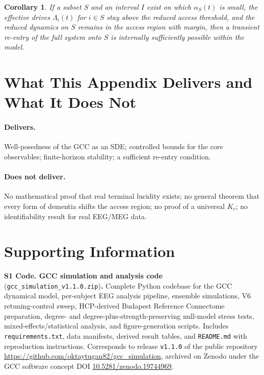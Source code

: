 \documentclass[11pt,a4paper]{article}
\theoremstyle{plain}
\newtheorem{corollary}[theorem]{Corollary}
\theoremstyle{definition}
\theoremstyle{remark}
\begin{document}
\begin{corollary}
\label{kor:lucidity}
If a subset $S$ and an interval $I$ exist on which $\alpha_S(t)$ is small, the effective drives $\Lambda_i(t)$ for $i \in S$ stay above the reduced access threshold, and the reduced dynamics on $S$ remains in the access region with margin, then a transient re-entry of the full system onto $S$ is internally sufficiently possible within the model.
\end{corollary}

\section{What This Appendix Delivers and What It Does Not}

\paragraph{Delivers.}
Well-posedness of the GCC as an SDE; controlled bounds for the core observables; finite-horizon stability; a sufficient re-entry condition.

\paragraph{Does not deliver.}
No mathematical proof that real terminal lucidity exists; no general theorem that every form of dementia shifts the access region; no proof of a universal $K_c$; no identifiability result for real EEG/MEG data.


\section*{Supporting Information}

\noindent\textbf{S1 Code. GCC simulation and analysis code} (\texttt{gcc\_simulation\_v1.1.0.zip})\textbf{.} Complete Python codebase for the GCC dynamical model, per-subject EEG analysis pipeline, ensemble simulations, V6 retuning-control sweep, HCP-derived Budapest Reference Connectome preparation, degree- and degree-plus-strength-preserving null-model stress tests, mixed-effects/statistical analysis, and figure-generation scripts. Includes \texttt{requirements.txt}, data manifests, derived result tables, and \texttt{README.md} with reproduction instructions. Corresponds to release \texttt{v1.1.0} of the public repository \url{https://github.com/oktaytugan82/gcc_simulation}, archived on Zenodo under the GCC software concept DOI \href{https://doi.org/10.5281/zenodo.19744969}{10.5281/zenodo.19744969}.
\end{document}
